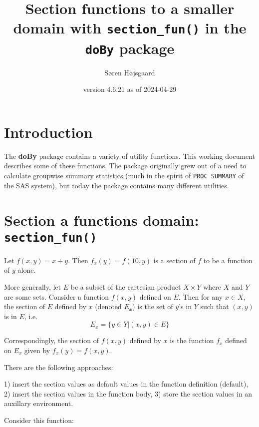 \documentclass[11pt]{article}\usepackage[]{graphicx}\usepackage[]{xcolor}
\title{Section functions to a smaller domain with \texttt{section\_fun()} in the \texttt{doBy} package}
\author{S{\o}ren H{\o}jsgaard}
\date{\pkg{doBy} version 4.6.21 as of 2024-04-29}
\def\proglang#1{{#1}}
\def\pkg#1{{\bf #1}}
\def\doby{\pkg{doBy}}
\def\code#1{\texttt{#1}}
\begin{document}


\maketitle
\tableofcontents
\parindent0pt
\parskip5pt









\section{Introduction}
\label{sec:introduction}


The \doby{} package contains a variety of utility functions. This
working document describes some of these functions. The package
originally grew out of a need to calculate groupwise summary
statistics (much in the spirit of \code{PROC SUMMARY} of the
\proglang{SAS} system), but today the package contains many different
utilities.




\section{Section a functions domain: \code{section\_fun()}}
\label{sec:section}


Let $f(x,y)=x+y$. Then $f_x(y)=f(10, y)$ is a
section of $f$ to be a function of $y$ alone.

More generally, let $E$ be a subset of the cartesian product $X \times Y$ where $X$
and $Y$ are some sets. Consider a function $f(x,y)$ defined on
$E$. Then for any $x \in X$, the section of $E$ defined by $x$
(denoted $E_x$) is the set of $y$'s in $Y$ such that $(x, y)$ is in
$E$, i.e.
$$
 E_x = \{ y \in Y | (x,y) \in E\}
$$

Correspondingly, the section of $f(x,y)$ defined by $x$ is the
function $f_x$ defined on $E_x$ given by $f_x(y)=f(x,y)$.

There are the following approaches:

1) insert the section values as default values in the function definition (default),
2) insert the section values in the function body,
3) store the section values in an auxillary environment.

Consider this function:
\end{document}
